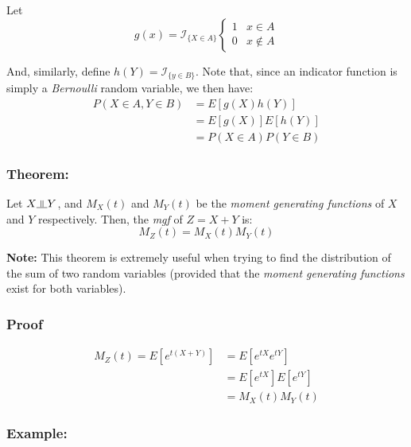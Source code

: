 \documentclass{article}
\newcommand{\indep}{\rotatebox[origin=c]{90}{$\models$}}
\begin{document}
Let
\begin{equation*}
    g(x) = \mathcal{I}_{\{X \in A\}}\begin{cases}
        1 & x \in A\\
        0 & x \not\in A
    \end{cases}
\end{equation*}

And, similarly, define $h(Y) = \mathcal{I}_{\{y \in B\}}$. Note that, since an indicator function is simply a \textit{Bernoulli} random variable, we then have:
\begin{equation*}
\begin{split}
    P(X \in A, Y \in B) &= E[g(X)h(Y)]\\
        &= E[g(X)]E[h(Y)]\\
        &= P(X \in A) P(Y \in B)
\end{split}
\end{equation*}


\subsubsection{Theorem:}

Let $X \indep Y$, and $M_X(t)$ and $M_Y(t)$ be the \textit{moment generating functions} of $X$ and $Y$ respectively. Then, the \textit{mgf} of $Z = X + Y$ is:
\begin{equation*}
    M_Z(t) = M_X(t)M_Y(t)
\end{equation*}

\noindent\textbf{Note: } This theorem is extremely useful when trying to find the distribution of the sum of two random variables (provided that the \textit{moment generating functions} exist for both variables).

\subsubsection*{Proof}

\begin{equation*}
    \begin{split}
        M_Z(t) = E[e^{t(X+Y)}] &= E[e^{tX}e^{tY}]\\
            &=E[e^{tX}]E[e^{tY}]\\
            &= M_X(t) M_Y(t)
    \end{split}
\end{equation*}

\subsubsection*{Example:}
\end{document}
